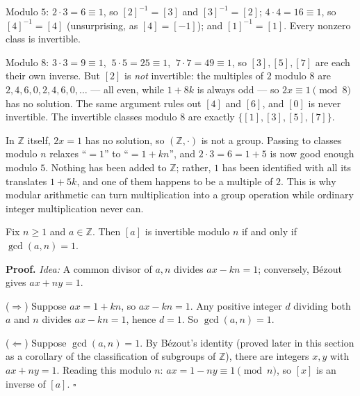 \documentclass[11pt]{report}
\renewenvironment{proof}[1][Proof]{\noindent\textbf{#1.} }{\hfill$\square$\par\vspace{5pt}}
\begin{document}
\begin{exbox}\label{ex:inverses-modulo-5-modulo-8}
Modulo $5$: $2 \cdot 3 = 6 \equiv 1$, so $[2]^{-1} = [3]$ and $[3]^{-1} = [2]$; $4 \cdot 4 = 16 \equiv 1$, so $[4]^{-1} = [4]$ (unsurprising, as $[4] = [-1]$); and $[1]^{-1} = [1]$. Every nonzero class is invertible.

Modulo $8$: $3 \cdot 3 = 9 \equiv 1$, $\ 5 \cdot 5 = 25 \equiv 1$, $\ 7 \cdot 7 = 49 \equiv 1$, so $[3], [5], [7]$ are each their own inverse. But $[2]$ is \emph{not} invertible: the multiples of $2$ modulo $8$ are $2, 4, 6, 0, 2, 4, 6, 0, \ldots$ --- all even, while $1 + 8k$ is always odd --- so $2x \equiv 1 \pmod 8$ has no solution. The same argument rules out $[4]$ and $[6]$, and $[0]$ is never invertible. The invertible classes modulo $8$ are exactly $\{[1], [3], [5], [7]\}$.
\end{exbox}

\begin{rembox}\label{rem:why-integers-have-no-inverses-but-classes-can}
In $\mathbb{Z}$ itself, $2x = 1$ has no solution, so $(\mathbb{Z}, \cdot)$ is not a group. Passing to classes modulo $n$ relaxes ``$= 1$'' to ``$= 1 + kn$'', and $2 \cdot 3 = 6 = 1 + 5$ is now good enough modulo $5$. Nothing has been added to $\mathbb{Z}$; rather, $1$ has been identified with all its translates $1 + 5k$, and one of them happens to be a multiple of $2$. This is why modular arithmetic can turn multiplication into a group operation while ordinary integer multiplication never can.
\end{rembox}

\begin{propbox}\label{prop:invertibility-criterion}
Fix $n \geq 1$ and $a \in \mathbb{Z}$. Then $[a]$ is invertible modulo $n$ if and only if $\gcd(a, n) = 1$.
\end{propbox}

\begin{proof}
\textit{Idea:} A common divisor of $a, n$ divides $ax - kn = 1$; conversely, B\'ezout gives $ax + ny = 1$.\par
($\Rightarrow$) Suppose $ax = 1 + kn$, so $ax - kn = 1$. Any positive integer $d$ dividing both $a$ and $n$ divides $ax - kn = 1$, hence $d = 1$. So $\gcd(a, n) = 1$.

($\Leftarrow$) Suppose $\gcd(a, n) = 1$. By B\'ezout's identity (proved later in this section as a corollary of the classification of subgroups of $\mathbb{Z}$), there are integers $x, y$ with $ax + ny = 1$. Reading this modulo $n$: $ax = 1 - ny \equiv 1 \pmod n$, so $[x]$ is an inverse of $[a]$.
\end{proof}
\end{document}
